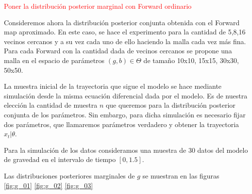 \textcolor{red}{Poner la distribución posterior marginal con Forward ordinario}

Consideremos ahora la distribución posterior conjunta obtenida con el Forward map aproximado. En este caso, se hace el experimento para la cantidad de 5,8,16 vecinos cercanos y a su vez cada uno de ello haciendo la malla cada vez más fina. Para cada Forward con la cantidad dada de vecinos cercanos se propone una malla en el espacio de parámetros $(g,b)\in \Theta$ de tamaño 10x10, 15x15, 30x30, 50x50.

La muestra inicial de la trayectoria que sigue el modelo se hace mediante simulación desde la misma ecuación diferencial dada por el modelo. Es de nuestra elección la cantidad de muestra $n$ que queremos para la distribución posterior conjunta de los parámetros. Sin embargo, para dicha simulación es necesario fijar dos parámetros, que llamaremos parámetros verdadero y obtener la trayectoria $x_t|\theta$. 

Para la simulación de los datos consideramos una muestra de 30 datos del modelo de gravedad en el intervalo de tiempo $[0,1.5]$. 

Las distribuciones posteriores marginales de $g$ se muestran en las figuras \ref{fig:g_01} \ref{fig:g_02}    \ref{fig:g_03} 




